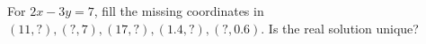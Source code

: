 For $2x-3y=7$, fill the missing coordinates in $(11,?), (?,7), (17,?), (1.4,?), (?,0.6)$. Is the real solution unique?
